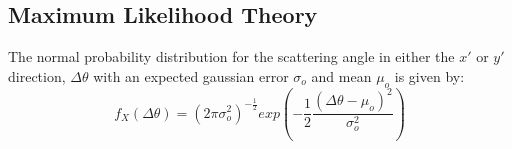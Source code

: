 \documentclass[a4paper,11pt]{article}
\begin{document}


\subsection{Maximum Likelihood Theory}\label{likelihood_theory_section}

The normal probability distribution for the scattering angle in either the $x'$ or $y'$ direction, $\Delta\theta$ with an expected gaussian error $\sigma_o$ and mean $\mu_o$ is given by:
\begin{equation}
f_X(\Delta\theta) = (2\pi\sigma_o^2)^{-\frac{1}{2}}exp(-\frac{1}{2}\frac{(\Delta\theta-\mu_o)^2}{\sigma_o^2})
\end{equation}
\end{document}
